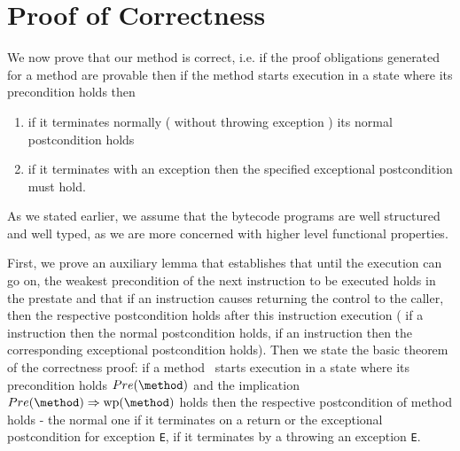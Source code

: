
\newcommand{\state}[1]{ \tau_{#1} } 
\newcommand{\straightBraces}[1]{ \texttt{ (} #1 \texttt{ )} }

\newcommand{\tbc}{\textit{TBC}}

\newtheorem{lemma1}{Progress lemma }
\newtheorem{th1}{Correctness }




\section{Proof of Correctness } \label{proof}

 
We now prove that our method is correct, i.e. if the proof obligations generated for a method are provable then if the method starts
execution in a state where its precondition holds then  
\begin{enumerate}
\item if it terminates normally ( without throwing exception ) its normal  postcondition holds
\item if it terminates with an exception then the specified exceptional postcondition must hold.
\end{enumerate}
As we stated earlier, we assume that the bytecode programs are well structured and well typed, as we are more concerned
 with higher level functional properties. 


 First, we prove an auxiliary lemma that establishes that until the execution can go on, the weakest precondition of the next instruction to be executed holds in the prestate and that if an instruction causes returning the control to the caller, then the respective postcondition holds after this instruction execution ( if a  instruction then the normal postcondition holds, if an  instruction then the corresponding exceptional postcondition holds).
 Then we state the basic theorem of the correctness proof: if a method \method \ starts execution in  a state where its precondition holds $Pre( \method)$ 
and the implication  $Pre( \method)  \Rightarrow \rm{wp}(\method) $ holds  then the  respective postcondition of method \method holds - 
the normal  one if it terminates on a return or the exceptional postcondition for exception \texttt{E}, if it terminates by a throwing an exception \texttt{E}. 

